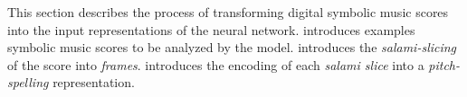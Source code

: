 

This section describes the process of transforming digital symbolic music scores into the input representations of the neural network.  introduces examples symbolic music scores to be analyzed by the model.  introduces the \emph{salami-slicing} of the score into \emph{frames}.  introduces the encoding of each \emph{salami slice} into a \emph{pitch-spelling} representation.
